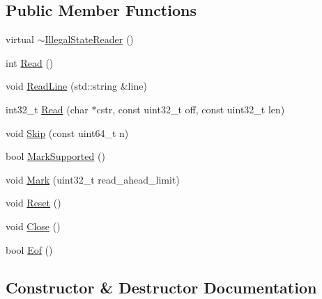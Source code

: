 \subsection*{Public Member Functions}
\begin{DoxyCompactItemize}
\item 
virtual \mbox{\hyperlink{classlucene_1_1core_1_1analysis_1_1IllegalStateReader_a9965d5df8761b75e9e5a1dadb5973dbd}{$\sim$\+Illegal\+State\+Reader}} ()
\item 
int \mbox{\hyperlink{classlucene_1_1core_1_1analysis_1_1IllegalStateReader_a9bca98f676ac3d0eeadfd4a2cc78d764}{Read}} ()
\item 
void \mbox{\hyperlink{classlucene_1_1core_1_1analysis_1_1IllegalStateReader_a39217e818ee6678830260a10885400f8}{Read\+Line}} (std\+::string \&line)
\item 
int32\+\_\+t \mbox{\hyperlink{classlucene_1_1core_1_1analysis_1_1IllegalStateReader_a8017ca4fc795b71e16bb87d4a24bdfa9}{Read}} (char $\ast$cstr, const uint32\+\_\+t off, const uint32\+\_\+t len)
\item 
void \mbox{\hyperlink{classlucene_1_1core_1_1analysis_1_1IllegalStateReader_aa2a34d98ca51e81297960b13aa0fa18e}{Skip}} (const uint64\+\_\+t n)
\item 
bool \mbox{\hyperlink{classlucene_1_1core_1_1analysis_1_1IllegalStateReader_ae2de5e9375664ca55c80b224ac3cd998}{Mark\+Supported}} ()
\item 
void \mbox{\hyperlink{classlucene_1_1core_1_1analysis_1_1IllegalStateReader_a96a8cb65743ac1a4db9633b2e0d203fb}{Mark}} (uint32\+\_\+t read\+\_\+ahead\+\_\+limit)
\item 
void \mbox{\hyperlink{classlucene_1_1core_1_1analysis_1_1IllegalStateReader_a7c457898d46f0dcf7de18a1730330c02}{Reset}} ()
\item 
void \mbox{\hyperlink{classlucene_1_1core_1_1analysis_1_1IllegalStateReader_aa92b3c9c3da611e2e44c3edf4078dbe6}{Close}} ()
\item 
bool \mbox{\hyperlink{classlucene_1_1core_1_1analysis_1_1IllegalStateReader_a0f3665a702d4b01dc3298e547379339a}{Eof}} ()
\end{DoxyCompactItemize}


\subsection{Constructor \& Destructor Documentation}
\mbox{\label{classlucene_1_1core_1_1analysis_1_1IllegalStateReader_a9965d5df8761b75e9e5a1dadb5973dbd}} 
